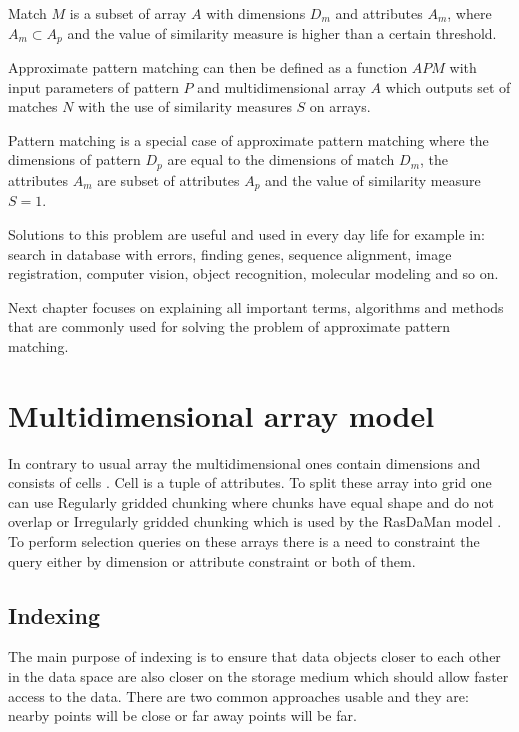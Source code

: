 Match $M$ is a subset of array $A$ with dimensions $D_m$ and attributes $A_m$, where $A_m \subset A_p$ and the value of similarity measure is higher than a certain threshold.

Approximate pattern matching can then be defined as a function $APM$ with input parameters of pattern $P$ and multidimensional array $A$ which outputs set of matches $N$ with the use of similarity measures $S$ on arrays.

Pattern matching is a special case of approximate pattern matching where the dimensions of pattern $D_p$ are equal to the dimensions of match $D_m$, the attributes $A_m$ are subset of attributes $A_p$ and the value of similarity measure $S = 1$.

Solutions to this problem are useful and used in every day life for example in: search in database with errors, finding genes, sequence alignment, image registration, computer vision, object recognition, molecular modeling and so on. 

Next chapter focuses on explaining all important terms, algorithms and methods that are commonly used for solving the problem of approximate pattern matching.


\section{Multidimensional array model}
In contrary to usual array the multidimensional ones contain dimensions and consists of cells \cite{samet}. Cell is a tuple of attributes. To split these array into grid one can use Regularly gridded chunking where chunks have equal shape and do not overlap or Irregularly gridded chunking which is used by the RasDaMan model \cite{rasdaman}.
To perform selection queries on these arrays there is a need to constraint the query either by dimension or attribute constraint or both of them.
\subsection{Indexing}
The main purpose of indexing is to ensure that data objects closer to each other in the data space are also closer on the storage medium which should allow faster access to the data. There are two common approaches usable and they are: nearby points will be close or far away points will be far. 
